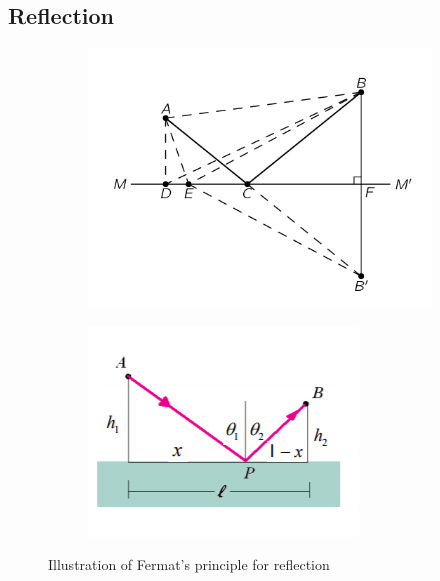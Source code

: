 \documentclass[../main.tex]{subfiles}
\begin{document}
	\subsection{Reflection}
	\begin{figure}[h!]
		\centering
		\begin{subfigure}[b]{0.4\linewidth}
			\includegraphics[width=\linewidth]{../graphics/Geometrical_optics1.png}
		\end{subfigure}
		\begin{subfigure}[b]{0.4\linewidth}
			\includegraphics[width=\linewidth]{../graphics/Geometrical_optics2.png}
		\end{subfigure}
		\caption{Illustration of Fermat’s principle for reflection}
	  	\label{fig:Fermat1}	  
	\end{figure}
\end{document}
